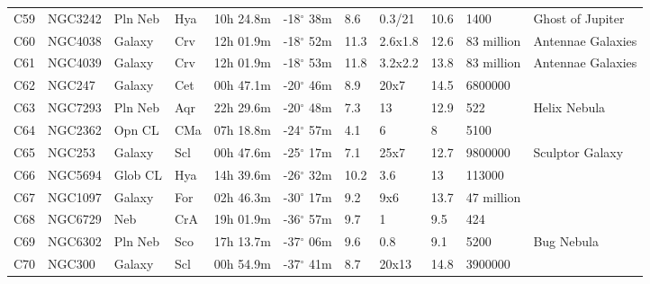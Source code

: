 \documentclass[10pt,twoside,a4paper,english]{article}
\begin{document}
\begin{longtable}{@{}lllllllllll@{}}
C59        & NGC3242     & Pln Neb    & Hya       & 10h 24.8m & -18$^{\circ}$ 38m  & 8.6       & 0.3/21               & 10.6     & 1400                & Ghost of Jupiter                \\ 
C60        & NGC4038     & Galaxy     & Crv       & 12h 01.9m & -18$^{\circ}$ 52m  & 11.3      & 2.6x1.8              & 12.6     & 83 million          & Antennae Galaxies               \\ 
C61        & NGC4039     & Galaxy     & Crv       & 12h 01.9m & -18$^{\circ}$ 53m  & 11.8      & 3.2x2.2              & 13.8     & 83 million          & Antennae Galaxies               \\ 
C62        & NGC247      & Galaxy     & Cet       & 00h 47.1m & -20$^{\circ}$ 46m  & 8.9       & 20x7                 & 14.5     & 6800000             &                                 \\ 
C63        & NGC7293     & Pln Neb    & Aqr       & 22h 29.6m & -20$^{\circ}$ 48m  & 7.3       & 13                   & 12.9     & 522                 & Helix Nebula                    \\ 
C64        & NGC2362     & Opn CL     & CMa       & 07h 18.8m & -24$^{\circ}$ 57m  & 4.1       & 6                    & 8        & 5100                &                                 \\ 
C65        & NGC253      & Galaxy     & Scl       & 00h 47.6m & -25$^{\circ}$ 17m  & 7.1       & 25x7                 & 12.7     & 9800000             & Sculptor Galaxy                 \\ 
C66        & NGC5694     & Glob CL    & Hya       & 14h 39.6m & -26$^{\circ}$ 32m  & 10.2      & 3.6                  & 13       & 113000              &                                 \\ 
C67        & NGC1097     & Galaxy     & For       & 02h 46.3m & -30$^{\circ}$ 17m  & 9.2       & 9x6                  & 13.7     & 47 million          &                                 \\ 
C68        & NGC6729     & Neb        & CrA       & 19h 01.9m & -36$^{\circ}$ 57m  & 9.7       & 1                    & 9.5      & 424                 &                                 \\ 
C69        & NGC6302     & Pln Neb    & Sco       & 17h 13.7m & -37$^{\circ}$ 06m  & 9.6       & 0.8                  & 9.1      & 5200                & Bug Nebula                      \\ 
C70        & NGC300      & Galaxy     & Scl       & 00h 54.9m & -37$^{\circ}$ 41m  & 8.7       & 20x13                & 14.8     & 3900000             &                                 \\ 

\end{longtable}
\end{document}
